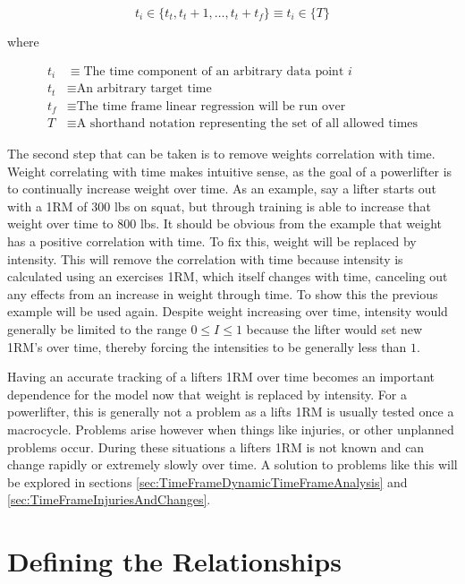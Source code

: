 \begin{equation}
    \label{eq:TimeFrame}
    t_i \in\{ t_t, t_t+1,\dots,t_t+t_f \}
    \equiv t_i \in \{ T \}
\end{equation}
\centerline{where}
\begin{equation*}
    \begin{split}
        t_i &\equiv \text{The time component of an arbitrary data point }i \\
        t_t &\equiv \text{An arbitrary target time} \\
        t_f &\equiv \text{The time frame linear regression will be run over} \\
        T & \equiv \text{A shorthand notation representing the set of all allowed times}
    \end{split}
\end{equation*}

The second step that can be taken is to remove weights correlation with time. Weight correlating with time makes intuitive sense, as the goal of a powerlifter is to continually increase weight over time. As an example, say a lifter starts out with a 1RM of $300$ lbs on squat, but through training is able to increase that weight over time to $800$ lbs. It should be obvious from the example that weight has a positive correlation with time. To fix this, weight will be replaced by intensity. This will remove the correlation with time because intensity is calculated using an exercises 1RM, which itself changes with time, canceling out any effects from an increase in weight through time. To show this the previous example will be used again. Despite weight increasing over time, intensity would generally be limited to the range $0\le I\le 1$ because the lifter would set new 1RM's over time, thereby forcing the intensities to be generally less than $1$.

Having an accurate tracking of a lifters 1RM over time becomes an important dependence for the model now that weight is replaced by intensity. For a powerlifter, this is generally not a problem as a lifts 1RM is usually tested once a macrocycle. Problems arise however when things like injuries, or other unplanned problems occur. During these situations a lifters 1RM is not known and can change rapidly or extremely slowly over time. A solution to problems like this will be explored in sections \ref{sec:TimeFrameDynamicTimeFrameAnalysis} and \ref{sec:TimeFrameInjuriesAndChanges}.

\section{Defining the Relationships}
\label{sec:PotentialSurfaceDefiningTheRelationships}

